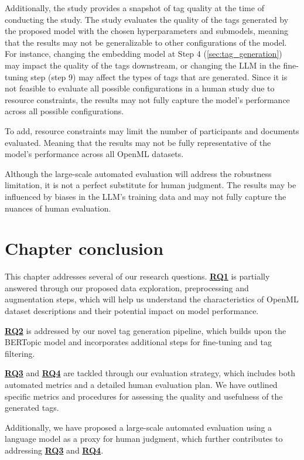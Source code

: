 Additionally, the study provides a snapshot of tag quality at the time of conducting the study. The study evaluates the quality of the tags generated by the proposed model with the chosen hyperparameters and submodels, meaning that the results may not be generalizable to other configurations of the model. For instance, changing the embedding model at Step 4 (\cref{sec:tag_generation}) may impact the quality of the tags downstream, or changing the LLM in the fine-tuning step (step 9) may affect the types of tags that are generated. Since it is not feasible to evaluate all possible configurations in a human study due to resource constraints, the results may not fully capture the model's performance across all possible configurations.

To add, resource constraints may limit the number of participants and documents evaluated. Meaning that the results may not be fully representative of the model's performance across all OpenML datasets.

Although the large-scale automated evaluation will address the robustness limitation, it is not a perfect substitute for human judgment. The results may be influenced by biases in the LLM's training data and may not fully capture the nuances of human evaluation.

\section{Chapter conclusion}
This chapter addresses several of our research questions. \hyperref[rq1]{\textbf{RQ1}} is partially answered through our proposed data exploration, preprocessing and augmentation steps, which will help us understand the characteristics of OpenML dataset descriptions and their potential impact on model performance.

\hyperref[rq2]{\textbf{RQ2}} is addressed by our novel tag generation pipeline, which builds upon the BERTopic model and incorporates additional steps for fine-tuning and tag filtering.

\hyperref[rq3]{\textbf{RQ3}} and \hyperref[rq4]{\textbf{RQ4}} are tackled through our evaluation strategy, which includes both automated metrics and a detailed human evaluation plan. We have outlined specific metrics and procedures for assessing the quality and usefulness of the generated tags.

Additionally, we have proposed a large-scale automated evaluation using a language model as a proxy for human judgment, which further contributes to addressing \hyperref[rq3]{\textbf{RQ3}} and \hyperref[rq4]{\textbf{RQ4}}.